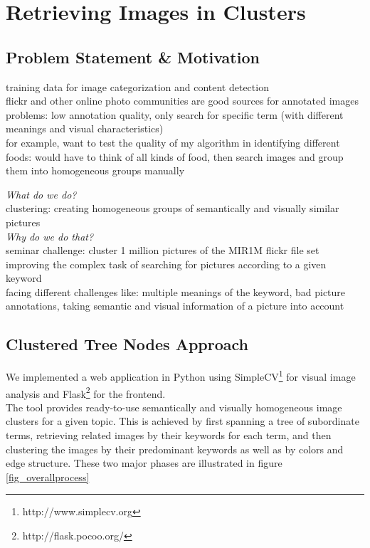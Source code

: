 \section{Retrieving Images in Clusters}
\label{sec_introduction}


\subsection{Problem Statement \& Motivation}
training data for image categorization and content detection \\
flickr and other online photo communities are good sources for annotated images \\
problems: low annotation quality, only search for specific term (with different meanings and visual characteristics) \\
for example, want to test the quality of my algorithm in identifying different foods: would have to think of all kinds of food, then search images and group them into homogeneous groups manually

\bigskip

\emph{What do we do?} \\
clustering: creating homogeneous groups of semantically and visually similar pictures \\

\emph{Why do we do that?} \\
seminar challenge: cluster 1 million pictures of the MIR1M flickr file   set \\
improving the complex task of searching for pictures according to a given keyword \\
facing different challenges like: multiple meanings of the keyword, bad picture annotations, taking semantic and visual information of a picture into account \\

\subsection{Clustered Tree Nodes Approach}
We implemented a web application in Python using SimpleCV\footnote{http://www.simplecv.org} for visual image analysis and Flask\footnote{http://flask.pocoo.org/} for the frontend.\\
The tool provides ready-to-use semantically and visually homogeneous image clusters for a given topic. This is achieved by first spanning a tree of subordinate terms, retrieving related images by their keywords for each term, and then clustering the images by their predominant keywords as well as by colors and edge structure. These two major phases are illustrated in figure \ref{fig_overallprocess}

